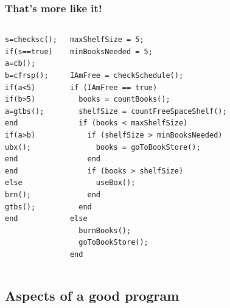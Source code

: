 \begin{frame}[fragile]
 \frametitle{That's more like it!}
 \begin{columns}[T]
     \begin{lstlisting}
s=checksc();
if(s==true)
a=cb();
b=cfrsp();
if(a<5)
if(b>5)
a=gtbs();
end
if(a>b)
ubx();
end
end
else
brn();
gtbs();
end
 \end{lstlisting}
     \begin{lstlisting}
maxShelfSize = 5;
minBooksNeeded = 5;

IAmFree = checkSchedule();
if (IAmFree == true)
  books = countBooks();
  shelfSize = countFreeSpaceShelf();
  if (books < maxShelfSize)
    if (shelfSize > minBooksNeeded)
      books = goToBookStore();
    end
    if (books > shelfSize)
      useBox();
    end
  end
else
  burnBooks();
  goToBookStore();
end
 \end{lstlisting}
 \end{columns}
\end{frame}

\subsection*{Aspects of a good program}

